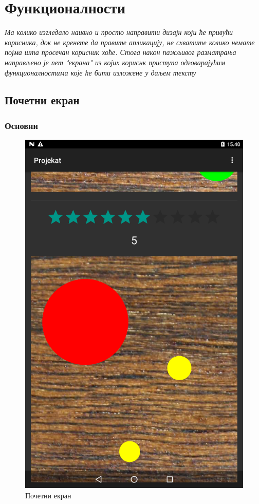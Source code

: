 \chapter{Функционалности} \label{UseCases}
\emph{Ма колико изгледало наивно и просто направити дизајн који ће привући корисника, док не кренете да правите апликацију, не схватите колико немате појма шта просечан корисник хоће. Стога након пажљивог разматрања направљено је пет "екрана" из којих кориснк приступа одговарајућим функционалностима које ће бити изложене у даљем тексту}

\section{Почетни екран}

\subsection{Основни}
\begin{figure}[htb!]
\begin{center}
\includegraphics[scale=.1]{pictures/main/Basic}
\caption{Почетни екран}\label{fig:mainBasic}
\end{center}
\end{figure}
